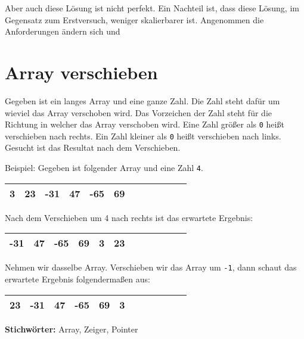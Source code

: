 \documentclass[babel]{book}
\begin{document}
Aber auch diese Lösung ist nicht perfekt. Ein Nachteil ist, dass diese Lösung, im Gegensatz zum Erstversuch, weniger skalierbarer ist. Angenommen die Anforderungen ändern sich und 

\section{Array verschieben}
\begin{examplei}
	Gegeben ist ein langes Array und eine ganze Zahl. Die Zahl steht dafür um wieviel das Array verschoben wird. Das Vorzeichen der Zahl steht für die Richtung in welcher das Array verschoben wird. Eine Zahl größer als \lstinline|0| heißt verschieben nach rechts. Ein Zahl kleiner als \lstinline|0| heißt verschieben nach links. Gesucht ist das Resultat nach dem Verschieben.
	
	Beispiel:
	Gegeben ist folgender Array und eine Zahl \lstinline|4|. 	
	
	\begin{tabular}{|l|l|l|l|l|l|l|l|l|l|l|l|} 
		\hline
		3 & 23 & -31 & 47 & -65 & 69 \\
		\hline
	\end{tabular}

	Nach dem Verschieben um 4 nach rechts ist das erwartete Ergebnis:
	
	\begin{tabular}{|l|l|l|l|l|l|l|l|l|l|l|l|} 
		\hline
		\cellcolor{yellow!25}-31 & \cellcolor{yellow!25}47 & \cellcolor{yellow!25}-65 & \cellcolor{yellow!25}69 & 3 & 23 \\
		\hline
	\end{tabular}
	
	Nehmen wir dasselbe Array. Verschieben wir das Array um \lstinline|-1|, dann schaut das erwartete Ergebnis folgendermaßen aus:
	
	\begin{tabular}{|l|l|l|l|l|l|l|l|l|l|l|l|} 
		\hline
		23 & -31 & 47 & -65 & 69 & \cellcolor{yellow!25}3 \\
		\hline
	\end{tabular}
	
\end{examplei}
{\bf Stichwörter:} Array, Zeiger, Pointer
\end{document}
